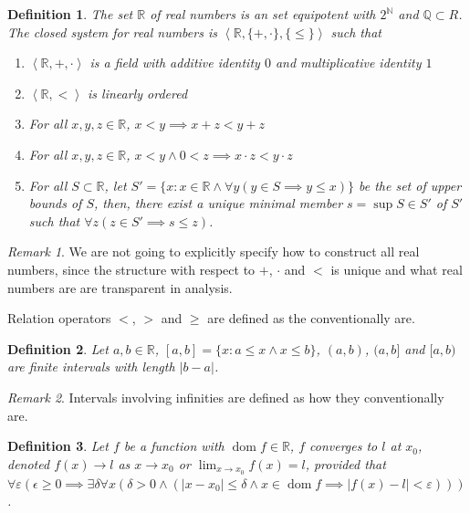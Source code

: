 \documentclass{book}
\newtheorem{definition}{Definition}
\theoremstyle{definition}\newtheorem{mechanism}{Mechanism}
\theoremstyle{remark}\newtheorem*{remark}{Remark}
\DeclareMathOperator*{\dom}{dom}
\begin{document}
\begin{definition}
	The set $\mathbb R$ of real numbers is an set equipotent with $2^{\mathbb N}$ and $\mathbb Q\subset R$. The closed system for real numbers is $\left<\mathbb R, \{+, \cdot\}, \{\le\}\right>$ such that
	
	\begin{enumerate}
		\item $\left<\mathbb R, +, \cdot\right>$ is a field with additive identity $0$ and multiplicative identity $1$
		\item $\left<\mathbb R, <\right>$ is linearly ordered
		\item For all $x, y, z\in \mathbb R$, $x < y\implies x + z < y + z$
		\item For all $x, y, z\in \mathbb R$, $x < y \land 0 < z\implies x\cdot z < y\cdot z$
		\item For all $S\subset \mathbb R$, let $S' = \{x: x\in \mathbb R\land \forall y(y\in S\implies y \le x)\}$ be the set of upper bounds of $S$, then, there exist a unique minimal member $s = \sup S\in S'$ of $S'$ such that $\forall z(z\in S'\implies s \le z)$.
	\end{enumerate} 
\end{definition}

\begin{remark}
	We are not going to explicitly specify how to construct all real numbers, since the structure with respect to $+$, $\cdot$ and $<$ is unique and what real numbers are are transparent in analysis.
	
	Relation operators $<$, $>$ and $\ge$ are defined as the conventionally are.
\end{remark}

\begin{definition}
	Let $a, b\in \mathbb R$, $[a, b] = \{x: a\le x\land x\le b\}$, $(a, b)$, $(a, b]$ and $[a, b)$ are finite intervals with length $|b - a|$.
\end{definition}

\begin{remark}
	Intervals involving infinities are defined as how they conventionally are.
\end{remark}

\begin{definition}
	Let $f$ be a function with $\dom f\in \mathbb R$, $f$ converges to  $l$ at $x_0$, denoted $f(x)\to l$ as $x\to x_0$ or $\lim_{x\to x_0} f(x) = l$, provided that $\forall \varepsilon(\epsilon \ge 0\implies\exists \delta\forall x(\delta > 0\land (|x - x_0|\le \delta\land x\in \dom f \implies |f(x) - l|<\varepsilon)))$.
\end{definition}
\end{document}
